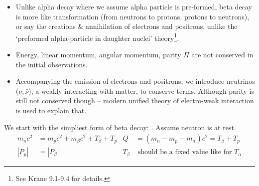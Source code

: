 \documentclass{school-22.101-notes}
\date{November 21, 2011}
\begin{document}
\maketitle

\begin{itemize}
\item Unlike alpha decay where we assume alpha particle is pre-formed, beta decay is more like transformation (from neutrons to protons, protons to neutrons), or say the creations \& annihilation of electrons and positrons, unlike the `preformed alpha-particle in daughter nuclei' theory\footnote{See Krane 9.1-9.4 for details.}. 
\item Energy, linear momentum, angular momentum, parity $\Pi$ are not conserved in the initial observations.
\item Accompanying the emission of electrons and positrons, we introduce neutrinos ($\nu, \bar{\nu}$), a weakly interacting with matter, to conserve terms. Although parity is still not conserved though -- modern unified theory of electro-weak interaction is used to explain that.  
\end{itemize}

We start with the simpliest form of beta decay: . Assume neutron is at rest.
\begin{align}
m_n c^2 &= m_p c^2 + m_{\beta} c^2 + T_{\beta} + T_p &  Q &= (m_n -m_p - m_{\alpha}) c^2 = T_{\beta} + T_p \\
|P_p| &= |P_{\beta}| & T_{\beta} &\mbox{ should be a fixed value like for }T_{\alpha}
\end{align}
\end{document}
